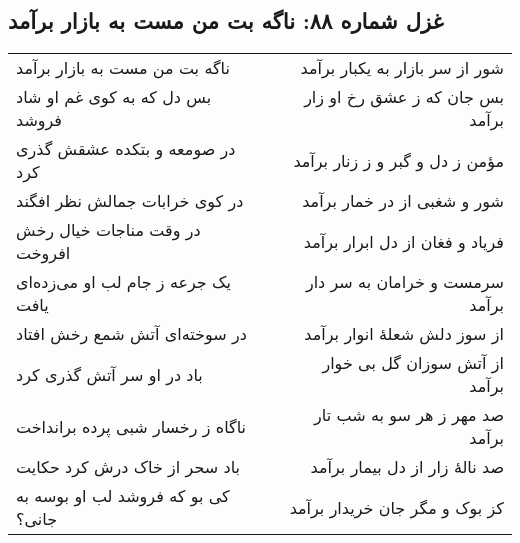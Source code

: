 \begin{center}
\section*{غزل شماره ۸۸: ناگه بت من مست به بازار برآمد}
\label{sec:088}
\begin{longtable}{l p{0.5cm} r}
ناگه بت من مست به بازار برآمد
&&
شور از سر بازار به یکبار برآمد
\\
بس دل که به کوی غم او شاد فروشد
&&
بس جان که ز عشق رخ او زار برآمد
\\
در صومعه و بتکده عشقش گذری کرد
&&
مؤمن ز دل و گبر و ز زنار برآمد
\\
در کوی خرابات جمالش نظر افگند
&&
شور و شغبی از در خمار برآمد
\\
در وقت مناجات خیال رخش افروخت
&&
فریاد و فغان از دل ابرار برآمد
\\
یک جرعه ز جام لب او می‌زده‌ای یافت
&&
سرمست و خرامان به سر دار برآمد
\\
در سوخته‌ای آتش شمع رخش افتاد
&&
از سوز دلش شعلهٔ انوار برآمد
\\
باد در او سر آتش گذری کرد
&&
از آتش سوزان گل بی خوار برآمد
\\
ناگاه ز رخسار شبی پرده برانداخت
&&
صد مهر ز هر سو به شب تار برآمد
\\
باد سحر از خاک درش کرد حکایت
&&
صد نالهٔ زار از دل بیمار برآمد
\\
کی بو که فروشد لب او بوسه به جانی؟
&&
کز بوک و مگر جان خریدار برآمد
\\
\end{longtable}
\end{center}
